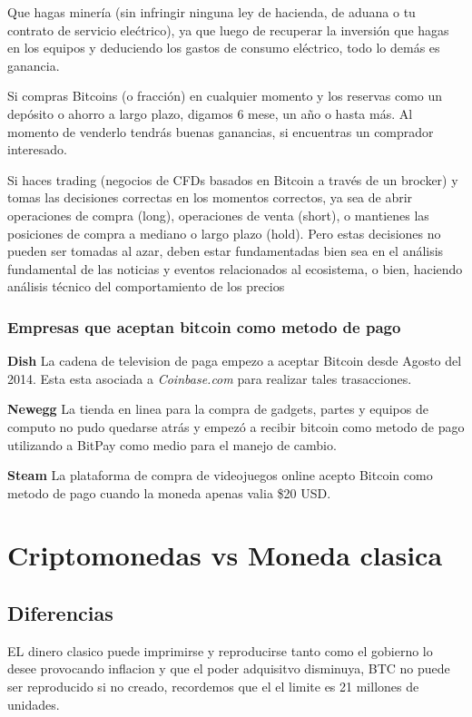 \documentclass[12pt,letterpaper]{article}
\begin{document}
        Que hagas minería (sin infringir ninguna ley de hacienda, de aduana o tu contrato de servicio elećtrico), ya que luego de recuperar la inversión que hagas en los equipos y deduciendo los gastos de consumo eléctrico, todo lo demás es ganancia.

        Si compras Bitcoins (o fracción) en cualquier momento y los reservas como un depósito o ahorro a largo plazo, digamos 6 mese, un año o hasta más. Al momento de venderlo tendrás buenas ganancias, si encuentras un comprador interesado.

        Si haces trading (negocios de CFDs basados en Bitcoin a través de un brocker) y tomas las decisiones correctas en los momentos correctos, ya sea de abrir operaciones de compra (long), operaciones de venta (short), o mantienes las posiciones de compra a mediano o largo plazo (hold).
        Pero estas decisiones no pueden ser tomadas al azar, deben estar fundamentadas bien sea en el análisis fundamental de las noticias y eventos relacionados al ecosistema, o bien, haciendo análisis técnico del comportamiento de los precios
            \subsubsection*{Empresas que aceptan bitcoin como metodo de pago}
\textbf{Dish}
La cadena de television de paga empezo a aceptar Bitcoin desde Agosto del 2014. Esta esta asociada a \textit{Coinbase.com} para realizar tales trasacciones.

\textbf{Newegg}
La tienda en linea para la compra de gadgets, partes y equipos de computo no pudo quedarse atr\'as y empez\'o a recibir bitcoin como metodo de pago utilizando a BitPay como medio para el manejo de cambio.

\textbf{Steam}
La plataforma de compra de videojuegos online acepto Bitcoin como metodo de pago cuando la moneda apenas valia \$20 USD.
\section*{Criptomonedas vs Moneda clasica}

	\subsection*{Diferencias}
	EL dinero clasico puede imprimirse y reproducirse tanto como el gobierno lo desee provocando inflacion y que el poder adquisitvo disminuya, BTC no puede ser reproducido si no creado, recordemos que el el limite es 21 millones de unidades.
	
\end{document}

